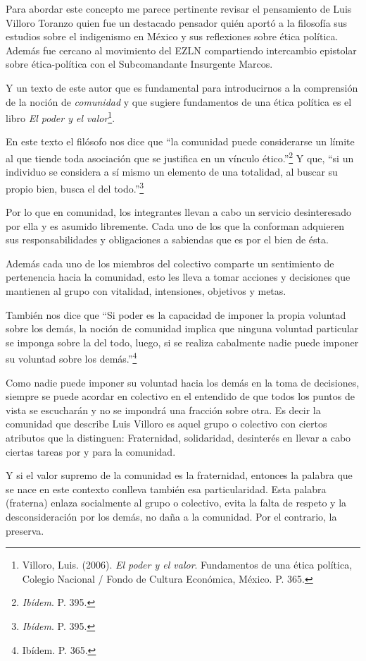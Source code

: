 \documentclass[oneside]{book}
\begin{document}
Para abordar este concepto me parece pertinente revisar el pensamiento de Luis Villoro Toranzo quien fue un destacado pensador quién aportó a la filosofía sus estudios sobre el indigenismo en México y sus reflexiones sobre ética política. Además fue cercano al movimiento del EZLN compartiendo intercambio epistolar sobre ética-política con el Subcomandante Insurgente Marcos.

Y un texto de este autor que es fundamental para introducirnos a la comprensión de la noción de \textit{comunidad} y que sugiere fundamentos de una ética política es el libro \textit{El poder y el valor}\footnote{Villoro,  Luis. (2006). \textit{El poder y el valor}. Fundamentos de una ética política, Colegio Nacional / Fondo de Cultura Económica, México. P. 365.}. 

En este texto el filósofo nos dice que “la comunidad puede considerarse un límite al que tiende toda asociación que se justifica en un vínculo ético.”\footnote{\textit{Ibídem}. P. 395.} Y que, “si un individuo se considera a sí mismo un elemento de una totalidad, al buscar su propio bien, busca el del todo.”\footnote{\textit{Ibídem}. P. 395.} 

Por lo que en comunidad, los integrantes llevan a cabo un servicio desinteresado por ella y es asumido libremente. Cada uno de los que la conforman adquieren sus responsabilidades y obligaciones a sabiendas que es por el bien de ésta.

Además cada uno de los miembros del colectivo comparte un sentimiento de pertenencia hacia la comunidad, esto les lleva a tomar acciones y decisiones que mantienen al grupo con vitalidad, intensiones, objetivos y metas.

También nos dice que “Si poder es la capacidad de imponer la propia voluntad sobre los demás, la noción de comunidad implica que ninguna voluntad particular se imponga sobre la del todo, luego, si se realiza cabalmente nadie puede imponer su voluntad sobre los demás.”\footnote{Ibídem. P. 365.}

Como nadie puede imponer su voluntad hacia los demás en la toma de decisiones, siempre se puede acordar en colectivo en el entendido de que todos los puntos de vista se escucharán y no se impondrá una fracción sobre otra. 	Es decir la comunidad que describe Luis Villoro es aquel grupo o colectivo con ciertos atributos que la distinguen: Fraternidad, solidaridad, desinterés en llevar a cabo ciertas tareas por y para la comunidad.  

Y si el valor supremo de la comunidad es la fraternidad, entonces la palabra que se nace en este contexto conlleva también esa particularidad. Esta palabra (fraterna) enlaza socialmente al grupo o colectivo, evita la falta de respeto y la desconsideración por los demás, no daña a la comunidad. Por el contrario, la preserva. 
\end{document}
